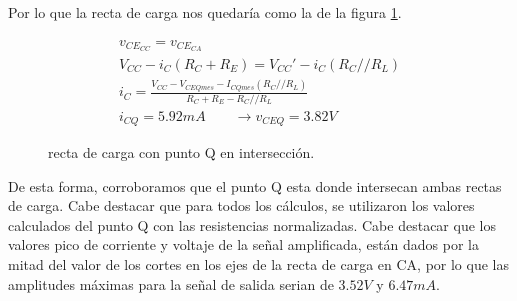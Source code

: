     Por lo que la recta de carga nos quedaría como la de la figura \ref{fig:recta_carga}.
    \begin{figure}[!ht]
      \centering
      \begin{minipage}{0.45\textwidth}
      \end{minipage}
      \begin{minipage}{0.54\textwidth}
        \begin{gather*}
          v_{CE_{CC}} = v_{CE_{CA}}\\[6pt]
          V_{CC} - i_C (R_C + R_E) = V_{CC}' - i_C (R_C//R_L)\\[6pt]
          i_C = \frac{V_{CC} - V_{CEQ mes} - I_{CQ mes} (R_C//R_L)}{R_C + R_E - R_C//R_L}\\[6pt]
          i_{CQ} = 5.92mA \qquad \to v_{CEQ} = 3.82V
        \end{gather*}
      \end{minipage}
      \caption{recta de carga con punto Q en intersección.}
      \label{fig:recta_carga}
    \end{figure}

    De esta forma, corroboramos que el punto Q esta donde intersecan ambas rectas de carga. Cabe destacar que para todos
    los cálculos, se utilizaron los valores calculados del punto Q con las resistencias normalizadas. Cabe destacar que
    los valores pico de corriente y voltaje de la señal amplificada, están dados por la mitad del valor de los cortes
    en los ejes de la recta de carga en CA, por lo que las amplitudes máximas para la señal de salida serian de $3.52V$
    y $6.47mA$.
\newpage
